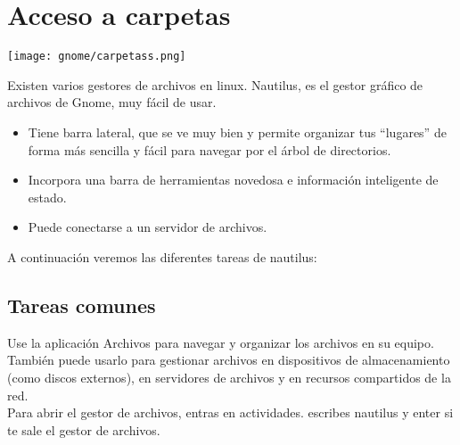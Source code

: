 \chapter{Acceso a carpetas}
\begin{center}
\texttt{[image: gnome/carpetass.png]}
\end{center}
Existen varios gestores de archivos en linux.
Nautilus, es el gestor gráfico de archivos de Gnome, muy fácil de usar.
\begin{itemize}
\item Tiene barra lateral, que se ve muy bien y permite organizar tus “lugares” de forma más sencilla y fácil para navegar por el árbol de directorios.
\item Incorpora una barra de herramientas novedosa e información inteligente de estado.
\item Puede conectarse a un servidor de archivos.
\end{itemize}
A continuación veremos las diferentes tareas de nautilus:
\section{Tareas comunes}
Use la aplicación Archivos para navegar y organizar los archivos en su equipo. También puede usarlo para gestionar archivos en dispositivos de almacenamiento (como discos externos), en servidores de archivos y en recursos compartidos de la red.\\
Para abrir el gestor de archivos, entras en actividades. escribes nautilus y enter si te sale el gestor de archivos.
